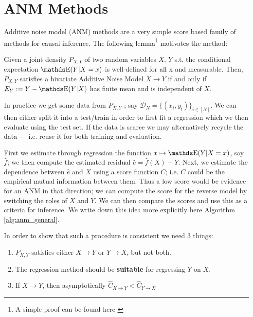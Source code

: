 \section{ANM Methods}

Additive noise model (ANM) methods are a very simple score based family of methods for causal inference.
The following lemma\footnote{A simple proof can be found here \cite{Mooij2016jmlr}} motivates the method:

\begin{lemma}
    Given a joint density $P_{X, Y}$ of two random variables $X$, $Y$ s.t. the conditional expectation
    $\E(Y |X = x)$ is well-defined for all x and measurable. Then, $P_{X, Y}$ satisfies a bivariate 
    Additive Noise Model $X \rightarrow Y$ if and only if $E_Y := Y - \E(Y|X)$ has 
    finite mean and is independent of $X$.
\end{lemma}

In practice we get some data from $P_{X, Y}$ ; say 
$\mathcal{D}_N = \{ (x_i, y_i )\}_{i \in [N]}$. We can then either split it into a test/train in order to 
first fit a regression which we then evaluate using the test set. If the data is scarce we may alternatively 
recycle the data --- i.e. reuse it for both training and evaluation.

First we estimate through regression the function $x \mapsto \E(Y | X=x)$, say $\hat{f}$; we 
then compute the estimated residual $\hat{e} = \hat{f}(X) - Y$. 
Next, we estimate the dependence between $\hat{e}$ and $X$ using a score function $C$; i.e. $C$ could be 
the empirical mutual information between them. Thus a low score would be evidence for an ANM in that direction; 
we can compute the score for the reverse model by switching the roles of $X$ and $Y$. We can then compare 
the scores and use this as a criteria for inference. We write down this idea more explicitly 
here Algorithm \ref{alg:anm_general}.

In order to show that such a procedure is consistent we need 3 things:

\begin{enumerate}
    \item $P_{X, Y}$ satisfies either $X \rightarrow Y$ or $Y \rightarrow X$, but not both.
    \item The regression method should be \textbf{suitable} for regressing $Y$ on $X$.
    \item If $X \rightarrow Y$, then asymptotically $\hat{C}_{X \rightarrow Y} < \hat{C}_{Y \rightarrow X}$
\end{enumerate}


